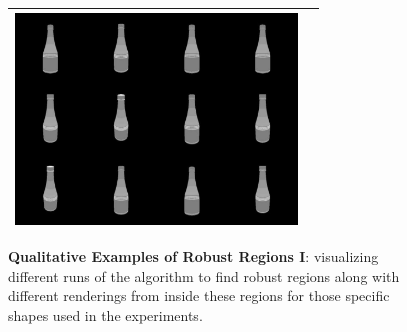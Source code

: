 \begin{figure}[h]
\begin{tabular}[!t]{c|c}
 \includegraphics[width = 7.5cm]{supimages/qualitative/bottle/bottle_s.png}\\ \hline 
\end{tabular}
   \caption{\small \textbf{Qualitative Examples of Robust Regions I}: visualizing different runs of the algorithm to find robust regions along with different renderings from inside these regions for those specific shapes used in the experiments. }
  \vspace{-8pt}
   \label{fig:ex1}
\end{figure}


